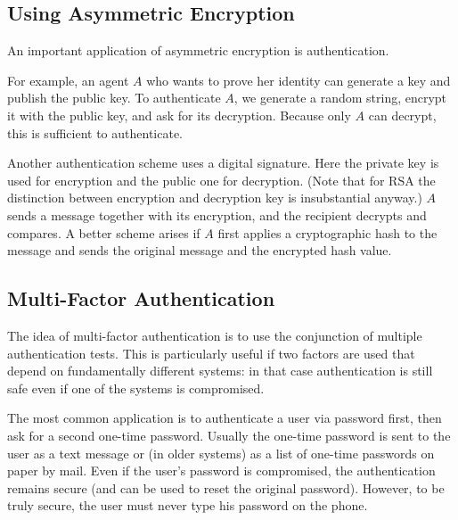 \subsection{Using Asymmetric Encryption}

An important application of asymmetric encryption is authentication.

For example, an agent $A$ who wants to prove her identity can generate a key and publish the public key.
To authenticate $A$, we generate a random string, encrypt it with the public key, and ask for its decryption.
Because only $A$ can decrypt, this is sufficient to authenticate.

Another authentication scheme uses a digital signature.
Here the private key is used for encryption and the public one for decryption. (Note that for RSA the distinction between encryption and decryption key is insubstantial anyway.)
$A$ sends a message together with its encryption, and the recipient decrypts and compares.
A better scheme arises if $A$ first applies a cryptographic hash to the message and sends the original message and the encrypted hash value.

\subsection{Multi-Factor Authentication}

The idea of multi-factor authentication is to use the conjunction of multiple authentication tests.
This is particularly useful if two factors are used that depend on fundamentally different systems: in that case authentication is still safe even if one of the systems is compromised.

The most common application is to authenticate a user via password first, then ask for a second one-time password.
Usually the one-time password is sent to the user as a text message or (in older systems) as a list of one-time passwords on paper by mail.
Even if the user's password is compromised, the authentication remains secure (and can be used to reset the original password).
However, to be truly secure, the user must never type his password on the phone.